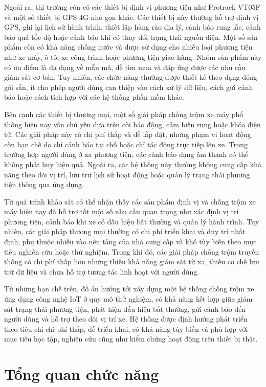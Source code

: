 \documentclass[../DoAn.tex]{subfiles}
\begin{document}
Ngoài ra, thị trường còn có các thiết bị định vị phương tiện như Protrack VT05F và một số thiết bị GPS 4G nhỏ gọn khác. Các thiết bị này thường hỗ trợ định vị GPS, ghi lại lịch sử hành trình, thiết lập hàng rào địa lý, cảnh báo rung lắc, cảnh báo quá tốc độ hoặc cảnh báo khi có thay đổi trạng thái nguồn điện. Một số sản phẩm còn có khả năng chống nước và được sử dụng cho nhiều loại phương tiện như xe máy, ô tô, xe công trình hoặc phương tiện giao hàng. Nhóm sản phẩm này có ưu điểm là đa dạng về mẫu mã, dễ tìm mua và đáp ứng được các nhu cầu giám sát cơ bản. Tuy nhiên, các chức năng thường được thiết kế theo dạng đóng gói sẵn, ít cho phép người dùng can thiệp vào cách xử lý dữ liệu, cách gửi cảnh báo hoặc cách tích hợp với các hệ thống phần mềm khác.

Bên cạnh các thiết bị thương mại, một số giải pháp chống trộm xe máy phổ thông hiện nay vẫn chủ yếu dựa trên còi báo động, cảm biến rung hoặc khóa điện tử. Các giải pháp này có chi phí thấp và dễ lắp đặt, nhưng phạm vi hoạt động còn hạn chế do chỉ cảnh báo tại chỗ hoặc chỉ tác động trực tiếp lên xe. Trong trường hợp người dùng ở xa phương tiện, các cảnh báo dạng âm thanh có thể không phát huy hiệu quả. Ngoài ra, các hệ thống này thường không cung cấp khả năng theo dõi vị trí, lưu trữ lịch sử hoạt động hoặc quản lý trạng thái phương tiện thông qua ứng dụng.

Từ quá trình khảo sát có thể nhận thấy các sản phẩm định vị và chống trộm xe máy hiện nay đã hỗ trợ tốt một số nhu cầu quan trọng như xác định vị trí phương tiện, cảnh báo khi xe có dấu hiệu bất thường và quản lý hành trình. Tuy nhiên, các giải pháp thương mại thường có chi phí triển khai và duy trì nhất định, phụ thuộc nhiều vào nền tảng của nhà cung cấp và khó tùy biến theo mục tiêu nghiên cứu hoặc thử nghiệm. Trong khi đó, các giải pháp chống trộm truyền thống có chi phí thấp hơn nhưng thiếu khả năng giám sát từ xa, thiếu cơ chế lưu trữ dữ liệu và chưa hỗ trợ tương tác linh hoạt với người dùng.

Từ những hạn chế trên, đồ án hướng tới xây dựng một hệ thống chống trộm xe ứng dụng công nghệ IoT ở quy mô thử nghiệm, có khả năng kết hợp giữa giám sát trạng thái phương tiện, phát hiện dấu hiệu bất thường, gửi cảnh báo đến người dùng và hỗ trợ theo dõi vị trí xe. Hệ thống được định hướng phát triển theo tiêu chí chi phí thấp, dễ triển khai, có khả năng tùy biến và phù hợp với mục tiêu học tập, nghiên cứu cũng như kiểm chứng hoạt động trên thiết bị thật.

\section{Tổng quan chức năng}
\label{section:2.2}
\end{document}
